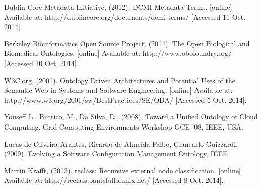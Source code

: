 \newblock Dublin Core Metadata Initiative, (2012). DCMI Metadata Terms. [online] Available at: http://dublincore.org/documents/dcmi-terms/ [Accessed 11 Oct. 2014].

\newblock Berkeley Bioinformatics Open Source Project, (2014). The Open Biological and Biomedical Ontologies. [online] Available at: http://www.obofoundry.org/ [Accessed 10 Oct. 2014].

\newblock W3C.org, (2001). Ontology Driven Architectures and Potential Uses of the Semantic Web in Systems and Software Engineering. [online] Available at:
 http://www.w3.org/2001/sw/BestPractices/SE/ODA/ [Accessed 5 Oct. 2014].

\newblock Youseff L., Butrico, M., Da Silva, D., (2008). Toward a Unified Ontology of Cloud Computing. Grid Computing Environments Workshop GCE '08, IEEE, USA.

\newblock Lucas de Oliveira Arantes, Ricardo de Almeida Falbo, Giancarlo Guizzardi, (2009). Evolving a Software Configuration Management Ontology, IEEE

\newblock Martin Krafft, (2013). reclass: Recursive external node classification. [online] Available at: http://reclass.pantsfullofunix.net/ [Accessed 8 Oct. 2014].










